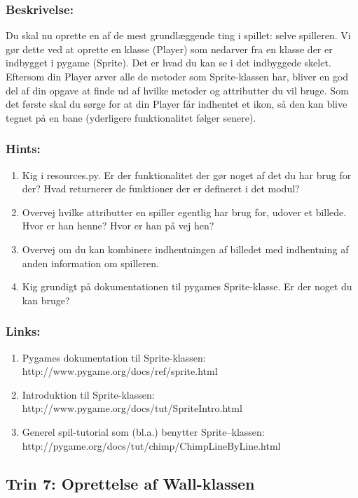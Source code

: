 \documentclass[10pt,a4paper,danish]{article}
\begin{document}
\subsubsection{Beskrivelse:}
Du skal nu oprette en af de mest grundlæggende ting i spillet: selve spilleren.
Vi gør dette ved at oprette en klasse (Player) som nedarver fra en klasse der
er indbygget i pygame (Sprite). Det er hvad du kan se i det indbyggede skelet. 
Eftersom din Player arver alle de metoder som Sprite-klassen har, bliver en 
god del af din opgave at finde ud af hvilke metoder og attributter du vil bruge.
Som det første skal du sørge for at din Player får indhentet et ikon, så den kan 
blive tegnet på en bane (yderligere funktionalitet følger senere). 
\\
\subsubsection{Hints:}
\begin{enumerate}
\item Kig i resources.py. Er der funktionalitet der gør noget af 
det du har brug for der? Hvad returnerer de funktioner der er defineret
i det modul?
\item Overvej hvilke attributter en spiller egentlig har brug for, udover
et billede. Hvor er han henne? Hvor er han på vej hen? 
\item Overvej om du kan kombinere indhentningen af billedet med indhentning
af anden information om spilleren.
\item Kig grundigt på dokumentationen til pygames Sprite-klasse. Er
der noget du kan bruge? 
\end{enumerate}

\subsubsection{Links:}
\begin{enumerate}
\item Pygames dokumentation til Sprite-klassen: http://www.pygame.org/docs/ref/sprite.html
\item Introduktion til Sprite-klassen: http://www.pygame.org/docs/tut/SpriteIntro.html
\item Generel spil-tutorial som (bl.a.) benytter Sprite--klassen: http://pygame.org/docs/tut/chimp/ChimpLineByLine.html
\end{enumerate}

\subsection{Trin 7: Oprettelse af Wall-klassen}
\end{document}
